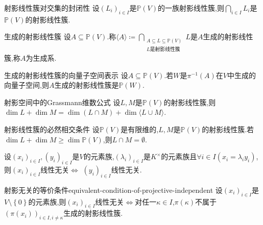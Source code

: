 \begin{proposition}{射影线性簇对交集的封闭性}{}
	设$\left(L_{i}\right)_{i\in I}$是$\mathbb{P}\left(V\right)$的一族射影线性簇,则$\bigcap\limits_{i\in I}L_{i}$是$\mathbb{P}\left(V\right)$的射影线性簇.
\end{proposition}

\begin{definition}{生成的射影线性簇}{}
	设$A\subseteq\mathbb{P}\left(V\right)$.称$\langle A\rangle\coloneq\bigcap\limits_{\substack{A\subseteq L\subseteq\mathbb{P}\left(V\right)\\ L\text{是射影线性簇}}}L$是$A$生成的射影线性簇,称$A$为生成系.
\end{definition}

\begin{proposition}{生成的射影线性簇的向量子空间表示}{}
	设$A\subseteq\mathbb{P}\left(V\right)$.若$W$是$\pi^{-1}\left(A\right)$在$V$中生成的向量子空间,则$A$生成的射影线性簇是$\mathbb{P}\left(W\right)$.
\end{proposition}

\begin{theorem}{射影空间中的Grassmann维数公式}{}
	设$L,M$是$\mathbb{P}\left(V\right)$的射影线性簇,则$\dim L+\dim M=\dim\left(L\cap M\right)+\dim\langle L\cup M\rangle$.
\end{theorem}

\begin{corollary}{射影线性簇的必然相交条件}{}
	设$\mathbb{P}\left(V\right)$是有限维的,$L,M$是$\mathbb{P}\left(V\right)$的射影线性簇.若$\dim L+\dim M\geq\dim\mathbb{P}\left(V\right)$,则$L\cap M=\emptyset$.
\end{corollary}

\begin{proposition}{}{}
	设$\left(x_{i}\right)_{i\in I},\left(y_{i}\right)_{i\in I}$是$V$的元素族,$\left(\lambda_{i}\right)_{i\in I}$是$K^{\times}$的元素族且$\forall i\in I\left(x_{i}=\lambda_{i}y_{i}\right)$,则$\left(x_{i}\right)_{i\in I}$线性无关$\iff$ $\left(y_{i}\right)_{i\in I}$线性无关.
\end{proposition}

\begin{proposition}{射影无关的等价条件}{equivalent-condition-of-projective-independent}
	设$\left(x_{i}\right)_{i\in I}$是$V\setminus\left\{0\right\}$的元素族,则$\left(x_{i}\right)_{i\in I}$线性无关$\iff$对任一$\kappa\in I$,$\pi\left(\kappa\right)$不属于$\left(\pi\left(x_{i}\right)\right)_{i\in I,i\neq\kappa}$生成的射影线性簇.
\end{proposition}


